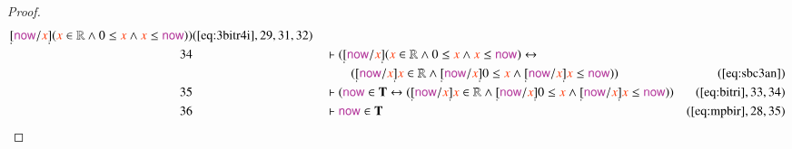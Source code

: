 \begin{proof}
\begin{align}
      \underaccent{\dot}{[} \mathsf{\mc{now}} / \msc{x}
      \underaccent{\dot}{]} ( \msc{x} \in \mathbb{R} \wedge
      0 \le \msc{x} \wedge \msc{x} \le \mathsf{\mc{now}} )
      )&(\mbox{\ref{eq:3bitr4i}},29,31,32)\notag
  \\ 34 &&  & \vdash ( \underaccent{\dot}{[} \mathsf{\mc{now}} / \msc{x}
      \underaccent{\dot}{]} ( \msc{x} \in \mathbb{R} \wedge
      0 \le \msc{x} \wedge \msc{x} \le \mathsf{\mc{now}} )
      \leftrightarrow  \notag \\ & & & \qquad
      ( \underaccent{\dot}{[}
      \mathsf{\mc{now}} / \msc{x} \underaccent{\dot}{]}
      \msc{x} \in \mathbb{R} \wedge \underaccent{\dot}{[}
      \mathsf{\mc{now}} / \msc{x} \underaccent{\dot}{]} 0
      \le \msc{x} \wedge \underaccent{\dot}{[}
      \mathsf{\mc{now}} / \msc{x} \underaccent{\dot}{]}
      \msc{x} \le \mathsf{\mc{now}} )
      )&(\mbox{\ref{eq:sbc3an}})\notag
  \\ 35 &&  & \vdash ( \mathsf{\mc{now}} \in \mathbf{T} \leftrightarrow (
      \underaccent{\dot}{[} \mathsf{\mc{now}} / \msc{x}
      \underaccent{\dot}{]} \msc{x} \in \mathbb{R} \wedge
      \underaccent{\dot}{[} \mathsf{\mc{now}} / \msc{x}
      \underaccent{\dot}{]} 0 \le \msc{x} \wedge
      \underaccent{\dot}{[} \mathsf{\mc{now}} / \msc{x}
      \underaccent{\dot}{]} \msc{x} \le \mathsf{\mc{now}} )
      )&(\mbox{\ref{eq:bitri}},33,34)\notag
  \\ 36 &&  & \vdash \mathsf{\mc{now}} \in
      \mathbf{T}&(\mbox{\ref{eq:mpbir}},28,35)\notag
\end{align}
\end{proof}

